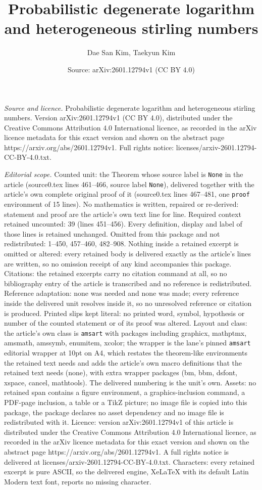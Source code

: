 \documentclass[10pt,a4paper]{amsart}
\title[Probabilistic degenerate logarithm and heterogeneous stirlin]{Probabilistic degenerate logarithm and heterogeneous stirling numbers}
\author{Dae San Kim, Taekyun Kim}
\date{Source: arXiv:2601.12794v1 (CC BY 4.0)}
\begin{document}
\maketitle

\noindent\emph{Source and licence.} Probabilistic degenerate logarithm and heterogeneous stirling numbers. Version arXiv:2601.12794v1 (CC BY 4.0), distributed under the Creative Commons Attribution 4.0 International licence, as recorded in the arXiv licence metadata for this exact version and shown on the abstract page https://arxiv.org/abs/2601.12794v1. Full rights notice: licenses/arxiv-2601.12794-CC-BY-4.0.txt.\par\smallskip

\noindent\textit{Editorial scope.} Counted unit: the Theorem whose source label is \texttt{None} in the article (source0.tex lines 461--466, source label \texttt{None}), delivered together with the article's own complete original proof of it (source0.tex lines 467--481, one \texttt{proof} environment of 15 lines). No mathematics is written, repaired or re-derived: statement and proof are the article's own text line for line. Required context retained uncounted: 39 (lines 451--456). Every definition, display and label of those lines is retained unchanged. Omitted from this package and not redistributed: 1--450, 457--460, 482--908. Nothing inside a retained excerpt is omitted or altered: every retained body is delivered exactly as the article's lines are written, so no omission receipt of any kind accompanies this package. Citations: the retained excerpts carry no citation command at all, so no bibliography entry of the article is transcribed and no reference is redistributed. Reference adaptation: none was needed and none was made; every reference inside the delivered unit resolves inside it, so no unresolved reference or citation is produced. Printed slips kept literal: no printed word, symbol, hypothesis or number of the counted statement or of its proof was altered. Layout and class: the article's own class is \texttt{amsart} with packages including graphicx, mathptmx, amsmath, amssymb, enumitem, xcolor; the wrapper is the lane's pinned \texttt{amsart} editorial wrapper at 10pt on A4, which restates the theorem-like environments the retained text needs and adds the article's own macro definitions that the retained text needs (none), with extra wrapper packages (bm, bbm, dsfont, xspace, cancel, mathtools). The delivered numbering is the unit's own. Assets: no retained span contains a figure environment, a graphics-inclusion command, a PDF-page inclusion, a table or a TikZ picture; no image file is copied into this package, the package declares no asset dependency and no image file is redistributed with it. Licence: version arXiv:2601.12794v1 of this article is distributed under the Creative Commons Attribution 4.0 International licence, as recorded in the arXiv licence metadata for this exact version and shown on the abstract page https://arxiv.org/abs/2601.12794v1. A full rights notice is delivered at licenses/arxiv-2601.12794-CC-BY-4.0.txt. Characters: every retained excerpt is pure ASCII, so the delivered engine, XeLaTeX with its default Latin Modern text font, reports no missing character.
\end{document}
